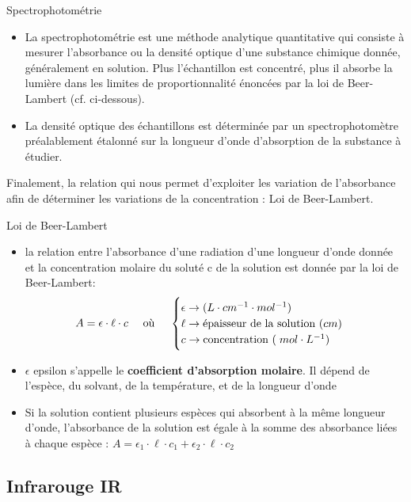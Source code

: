 \documentclass[11pt,a4paper]{article}
\begin{document}
\begin{defn}{Spectrophotométrie}
\begin{itemize}
    \item La spectrophotométrie est une méthode analytique quantitative qui consiste à mesurer l'absorbance ou la densité optique d'une substance chimique donnée, généralement en solution. Plus l'échantillon est concentré, plus il absorbe la lumière dans les limites de proportionnalité énoncées par la loi de Beer-Lambert (cf. ci-dessous).
    \item La densité optique des échantillons est déterminée par un spectrophotomètre préalablement étalonné sur la longueur d'onde d'absorption de la substance à étudier.
\end{itemize}
\end{defn}

Finalement, la relation qui nous permet d'exploiter les variation de l'absorbance afin de déterminer les variations de la concentration : Loi de Beer-Lambert. 

\begin{defn}{Loi de Beer-Lambert}
\begin{itemize}
    \item 	la relation entre l'absorbance d'une radiation d'une longueur d'onde donnée et la concentration molaire du soluté c de la solution est donnée par la loi de Beer-Lambert:
    \[
    A = \epsilon\cdot\ell\cdot c \quad \text{  où  }\quad 
    \begin{cases}
    \epsilon \rightarrow \text{}(L\cdot cm^{-1}\cdot mol^{-1}) \\
    \ell \rightarrow \text{épaisseur de la solution }(cm)\\
    c \rightarrow \text{concentration }(\; mol\cdot L^{-1} ) \\
    \end{cases}
    \]
    \item $\epsilon$ epsilon s'appelle le \textbf{coefficient d'absorption molaire}. Il dépend de l'espèce, du solvant, de la température, et de la longueur d'onde
    \item Si la solution contient plusieurs espèces qui absorbent à la même longueur d’onde, l’absorbance de la solution est égale à la somme des absorbance liées à chaque espèce : $A=\epsilon_1\cdot\ell\cdot c_1 + \epsilon_2\cdot\ell\cdot c_2$
\end{itemize}
\end{defn}

\subsection{Infrarouge IR}
\end{document}
